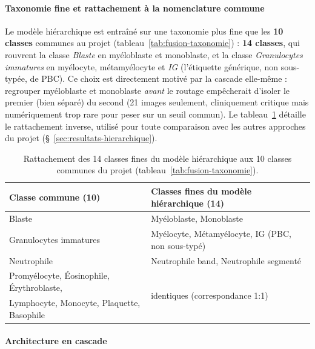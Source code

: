 \paragraph{Taxonomie fine et rattachement à la nomenclature commune}

Le modèle hiérarchique est entraîné sur une taxonomie plus fine que les \textbf{10 classes} communes au projet (tableau~\ref{tab:fusion-taxonomie}) : \textbf{14 classes}, qui rouvrent la classe \emph{Blaste} en myéloblaste et monoblaste, et la classe \emph{Granulocytes immatures} en myélocyte, métamyélocyte et \emph{IG} (l'étiquette générique, non sous-typée, de PBC).
Ce choix est directement motivé par la cascade elle-même : regrouper myéloblaste et monoblaste \emph{avant} le routage empêcherait d'isoler le premier (bien séparé) du second (21 images seulement, cliniquement critique mais numériquement trop rare pour peser sur un seuil commun).
Le tableau~\ref{tab:hierarchique-taxonomie} détaille le rattachement inverse, utilisé pour toute comparaison avec les autres approches du projet (\S~\ref{sec:resultats-hierarchique}).

\begin{table}[H]
  \centering
  \small
  \renewcommand{\arraystretch}{1.15}
  \begin{tabular}{@{}ll@{}}
    \toprule
    \textbf{Classe commune (10)} & \textbf{Classes fines du modèle hiérarchique (14)} \\
    \midrule
    Blaste                  & Myéloblaste, Monoblaste \\
    Granulocytes immatures  & Myélocyte, Métamyélocyte, IG (PBC, non sous-typé) \\
    Neutrophile              & Neutrophile band, Neutrophile segmenté \\
    Promyélocyte, Éosinophile, Érythroblaste, & \multirow{2}{*}{identiques (correspondance 1:1)} \\
    Lymphocyte, Monocyte, Plaquette, Basophile & \\
    \bottomrule
  \end{tabular}
  \caption{Rattachement des 14 classes fines du modèle hiérarchique aux 10 classes communes du projet (tableau~\ref{tab:fusion-taxonomie}).}
  \label{tab:hierarchique-taxonomie}
\end{table}

\paragraph{Architecture en cascade}

